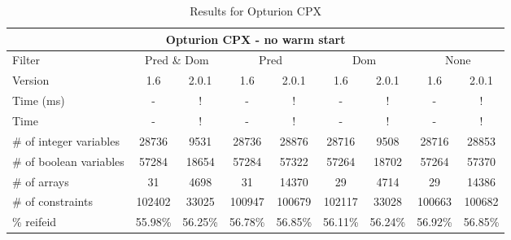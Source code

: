 \documentclass{standalone}
\begin{document}
\begin{table}[H]
\footnotesize
\centering
\begin{tabular}{lc|c|c|c|c|c|c|c}
\multicolumn{9}{c}{Opturion CPX - no warm start} \\ 
\hline\hline Filter & \multicolumn{2}{c|}{Pred \& Dom} &\multicolumn{2}{c|}{Pred}  & \multicolumn{2}{c|}{Dom} & \multicolumn{2}{c}{None} \\ 
\hline Version & 1.6 & 2.0.1 & 1.6 & 2.0.1 & 1.6 & 2.0.1 & 1.6 & 2.0.1 \\ 
Time (ms)               &    -     & !       & -       & !       & -       & !       & -       & !       \\ 
Time                    &    -     & !       & -       & !       & -       & !       & -       & !       \\ 
\# of integer variables & 28736    & 9531    & 28736   & 28876   & 28716   & 9508    & 28716   & 28853	  \\ 
\# of boolean variables & 57284    & 18654   & 57284   & 57322   & 57264   & 18702   & 57264   & 57370	  \\ 
\# of arrays            & 31       & 4698    & 31      & 14370   & 29      & 4714   & 29      & 14386	  \\ 
\# of constraints       & 102402   & 33025   & 100947  & 100679  & 102117  & 33028   & 100663  & 100682  \\ 
\% reifeid               & 55.98\%  & 56.25\% & 56.78\% & 56.85\% & 56.11\% & 56.24\% & 56.92\% & 56.85\% \\ 
\end{tabular}
\caption{Results for Opturion CPX}\label{tab:res_cpx}
\end{table}
\end{document}
